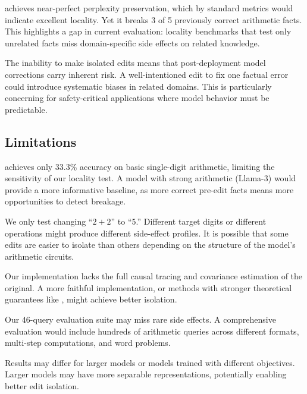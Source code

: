 \rome achieves near-perfect perplexity preservation, which by standard metrics would indicate excellent locality.
Yet it breaks 3 of 5 previously correct arithmetic facts.
This highlights a gap in current evaluation: locality benchmarks that test only unrelated facts miss domain-specific side effects on related knowledge.

The inability to make isolated edits means that post-deployment model corrections carry inherent risk.
A well-intentioned edit to fix one factual error could introduce systematic biases in related domains.
This is particularly concerning for safety-critical applications where model behavior must be predictable.

\subsection{Limitations}

\gptxl achieves only 33.3\% accuracy on basic single-digit arithmetic, limiting the sensitivity of our locality test.
A model with strong arithmetic (\eg Llama-3) would provide a more informative baseline, as more correct pre-edit facts means more opportunities to detect breakage.

We only test changing ``$2{+}2$'' to ``5.''
Different target digits or different operations might produce different side-effect profiles.
It is possible that some edits are easier to isolate than others depending on the structure of the model's arithmetic circuits.

Our \rome implementation lacks the full causal tracing and covariance estimation of the original.
A more faithful implementation, or methods with stronger theoretical guarantees like \alphaedit, might achieve better isolation.

Our 46-query evaluation suite may miss rare side effects.
A comprehensive evaluation would include hundreds of arithmetic queries across different formats, multi-step computations, and word problems.

Results may differ for larger models or models trained with different objectives.
Larger models may have more separable representations, potentially enabling better edit isolation.
